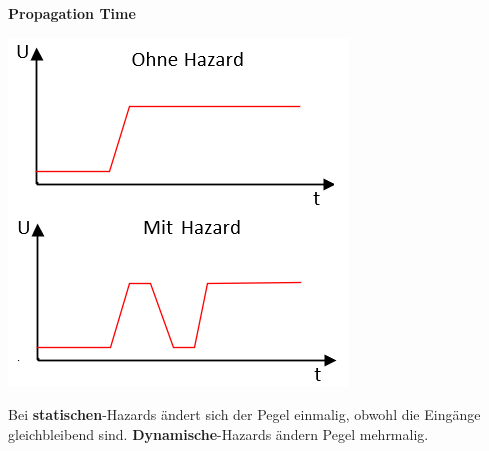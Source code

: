 \noindent\begin{minipage}{\textwidth}
	\noindent\textbf{Propagation Time}
	
	\begin{minipage}{0.2\textwidth}
		\includegraphics[width=\linewidth,keepaspectratio=true]{./Images/hazard.png}
	\end{minipage}%
	\begin{minipage}{0.25\textwidth}
			Bei \textbf{statischen}-Hazards ändert sich der Pegel einmalig, obwohl die Eingänge gleichbleibend sind. \textbf{Dynamische}-Hazards ändern Pegel mehrmalig.
	\end{minipage}
\end{minipage}

